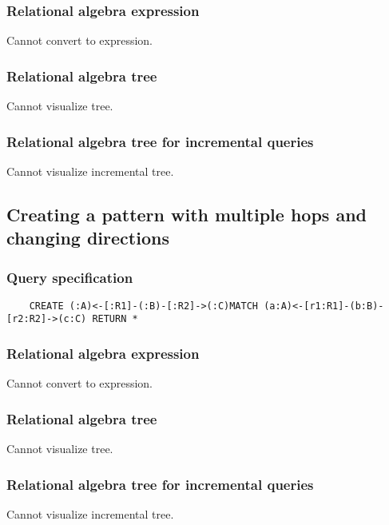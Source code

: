 	\subsubsection*{Relational algebra expression}

	Cannot convert to expression.

	\subsubsection*{Relational algebra tree}

	Cannot visualize tree.

	\subsubsection*{Relational algebra tree for incremental queries}

	Cannot visualize incremental tree.
	\subsection{Creating a pattern with multiple hops and changing directions}

	\subsubsection*{Query specification}

	\begin{lstlisting}
	CREATE (:A)<-[:R1]-(:B)-[:R2]->(:C)MATCH (a:A)<-[r1:R1]-(b:B)-[r2:R2]->(c:C) RETURN *
	\end{lstlisting}


	\subsubsection*{Relational algebra expression}

	Cannot convert to expression.

	\subsubsection*{Relational algebra tree}

	Cannot visualize tree.

	\subsubsection*{Relational algebra tree for incremental queries}

	Cannot visualize incremental tree.

